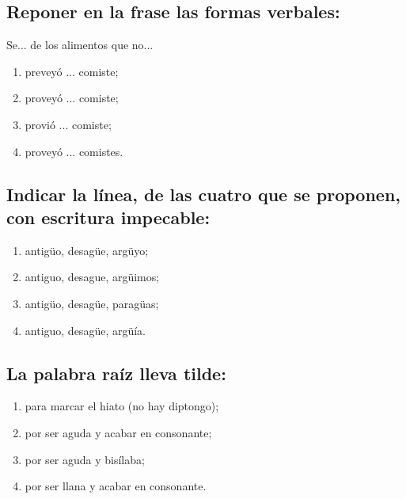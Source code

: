 \documentclass[12pt, a4paper, oneside]{report}
\begin{document}
            \subsection{Reponer en la frase las formas verbales:}
                Se... de los alimentos que no...
                \begin{enumerate}
                    \item preveyó ... comiste;
                    \item \color{verde}proveyó ... comiste\color{negro};
                    \item provió ... comiste;
                    \item proveyó ... comistes.
                \end{enumerate}
            \subsection{Indicar la línea, de las cuatro que se proponen, con escritura impecable:}
                \begin{enumerate}
                    \item antigüo, desagüe, argüyo;
                    \item antiguo, desague, argüimos;
                    \item antigüo, desagüe, paragüas;
                    \item \color{verde}antiguo, desagüe, argüía\color{negro}.
                \end{enumerate}
                \clearpage
            \subsection{La palabra raíz lleva tilde:}
                \begin{enumerate}
                    \item \color{verde}para marcar el hiato (no hay diptongo)\color{negro};
                    \item por ser aguda y acabar en consonante;
                    \item por ser aguda y bisílaba;
                    \item por ser llana y acabar en consonante.
                \end{enumerate}
\end{document}

